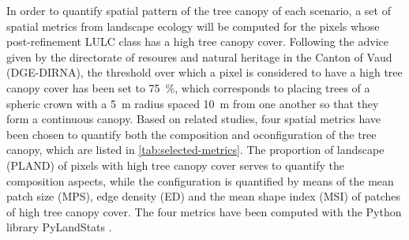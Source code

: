 \documentclass[10pt,letterpaper]{article}
\begin{document}
In order to quantify spatial pattern of the tree canopy of each scenario, a set of spatial metrics from landscape ecology \cite{o1988indices,mcgarigal2012fragstats} will be computed for the pixels whose post-refinement LULC class has a high tree canopy cover.  %
Following the advice given by the directorate of resoures and natural heritage in the Canton of Vaud (DGE-DIRNA), the threshold over which a pixel is considered to have a high tree canopy cover has been set to 75~\%, which corresponds to placing trees of a spheric crown with a 5~m radius spaced 10~m from one another so that they form a continuous canopy.
Based on related studies, four spatial metrics have been chosen to quantify both the composition and oconfiguration of the tree canopy, which are listed in \autoref{tab:selected-metrics}. The proportion of landscape (PLAND) of pixels with high tree canopy cover serves to quantify the composition aspects, while the configuration is quantified by means of the mean patch size (MPS), edge density (ED) and the mean shape index (MSI) of patches of high tree canopy cover. The four metrics have been computed with the Python library PyLandStats \cite{bosch2019pylandstats}.
\end{document}
